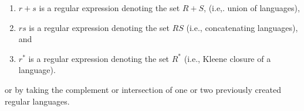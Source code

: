 \documentclass{report}
\begin{document}
\begin{itemize}
            \begin{enumerate}
                \item $r+s$ is a regular expression denoting the set $R + S$, (i.e,. union of languages),
                \item $rs$ is a regular expression denoting the set $RS$ (i.e., concatenating languages), and
                \item $r^{*}$ is a regular expression denoting the set $R^{*}$ (i.e., Kleene closure of a language).
            \end{enumerate}
            \bigbreak \noindent 
            or by taking the complement or intersection of one or two previously created regular languages.


    \end{itemize}
\end{document}
